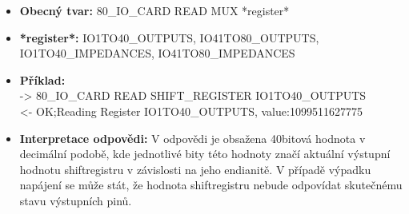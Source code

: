 \begin{itemize}[leftmargin=*]
    \item \textbf{Obecný tvar:} 80\_IO\_CARD READ MUX *register*
    \item \textbf{*register*:} IO1TO40\_OUTPUTS, IO41TO80\_OUTPUTS,\\
    IO1TO40\_IMPEDANCES, IO41TO80\_IMPEDANCES
    \item \textbf{Příklad:}\\
    -> 80\_IO\_CARD READ SHIFT\_REGISTER IO1TO40\_OUTPUTS\\
    <- OK;Reading Register IO1TO40\_OUTPUTS, value:1099511627775\\
    \item \textbf{Interpretace odpovědi:} V odpovědi je obsažena 40bitová hodnota v decimální podobě,
    kde jednotlivé bity této hodnoty značí aktuální výstupní hodnotu shiftregistru v závislosti na jeho endianitě.
    V případě výpadku napájení se může stát, že hodnota shiftregistru nebude odpovídat skutečnému stavu výstupních pinů.
\end{itemize}


